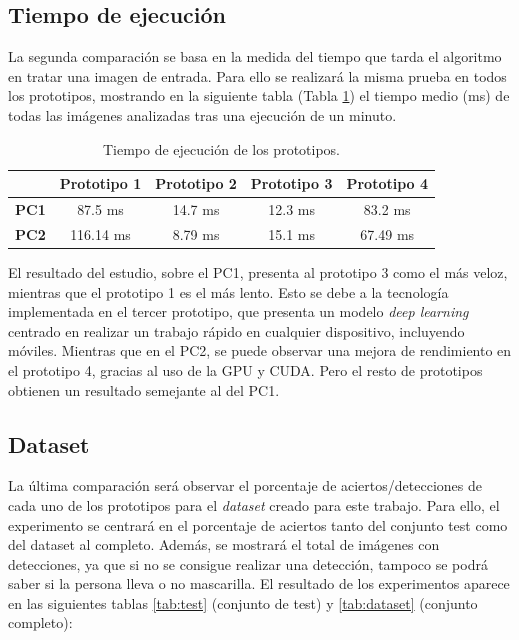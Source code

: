 \vspace{-0.7cm}
\subsection*{Tiempo de ejecución}
\vspace{-0.5cm}

La segunda comparación se basa en la medida del tiempo que tarda el algoritmo en tratar una imagen de entrada. Para ello se realizará la misma prueba en todos los prototipos, mostrando en la siguiente tabla (Tabla \ref{tab:table4}) el tiempo medio (ms) de todas las imágenes analizadas tras una ejecución de un minuto.

\begin{table}[h!]
	\begin{center}
		\begin{tabular}{ |c|c|c|c|c| } 
			\hline
			& \textbf{Prototipo 1} & \textbf{Prototipo 2} & \textbf{Prototipo 3} & \textbf{Prototipo 4} \\
			\hline
			\textbf{PC1} & 87.5 ms & 14.7 ms  & 12.3 ms & 83.2 ms \\
			\hline
			\textbf{PC2} & 116.14 ms & 8.79 ms  & 15.1 ms & 67.49 ms \\
			\hline
		\end{tabular}
		\caption{Tiempo de ejecución de los prototipos.}
		\label{tab:table4}
	\end{center}
\end{table}

El resultado del estudio, sobre el PC1, presenta al prototipo 3 como el más veloz, mientras que el prototipo 1 es el más lento. Esto se debe a la tecnología implementada en el tercer prototipo, que presenta un modelo \textit{deep learning} centrado en realizar un trabajo rápido en cualquier dispositivo, incluyendo móviles. Mientras que en el PC2, se puede observar una mejora de rendimiento en el prototipo 4, gracias al uso de la GPU y CUDA. Pero el resto de prototipos obtienen un resultado semejante al del PC1.

\vspace{-0.7cm}
\subsection*{Dataset}
\vspace{-0.5cm}

La última comparación será observar el porcentaje de aciertos/detecciones de cada uno de los prototipos para el \textit{dataset} creado para este trabajo. Para ello, el experimento se centrará en el porcentaje de aciertos tanto del conjunto test como del dataset al completo. Además, se mostrará el total de imágenes con detecciones, ya que si no se consigue realizar una detección, tampoco se podrá saber si la persona lleva o no mascarilla. El resultado de los experimentos aparece en las siguientes tablas \ref{tab:test} (conjunto de test) y \ref{tab:dataset} (conjunto completo):


